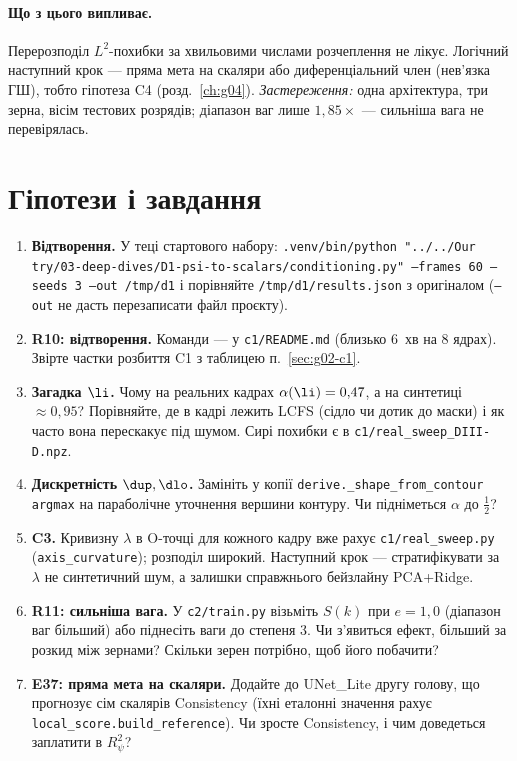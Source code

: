 \paragraph{Що з цього випливає.} Перерозподіл $L^2$-похибки за хвильовими числами розчеплення не
лікує. Логічний наступний крок --- пряма мета на скаляри або диференціальний член (нев'язка ГШ),
тобто гіпотеза C4 (розд.~\ref{ch:g04}). \emph{Застереження:} одна архітектура, три зерна, вісім
тестових розрядів; діапазон ваг лише $1{,}85\times$ --- сильніша вага не перевірялась.

\section{Гіпотези і завдання}\label{sec:g02-tasks}

\begin{practicum}
\begin{enumerate}
\item \textbf{Відтворення.} У теці стартового набору:
  \texttt{.venv/bin/python "../../Our try/03-deep-dives/D1-psi-to-scalars/conditioning.py"
  --frames 60 --seeds 3 --out /tmp/d1} і порівняйте \texttt{/tmp/d1/results.json} з
  оригіналом (\texttt{--out} не дасть перезаписати файл проєкту).
\item \textbf{R10: відтворення.} Команди --- у \texttt{c1/README.md} (близько 6~хв на
  8 ядрах). Звірте частки розбиття C1 з таблицею п.~\ref{sec:g02-c1}.
\item \textbf{Загадка $\li$.} Чому на реальних кадрах $\alpha(\li)=0{,}47$, а на синтетиці
  $\approx0{,}95$? Порівняйте, де в кадрі лежить LCFS (сідло чи дотик до маски) і як часто
  вона перескакує під шумом. Сирі похибки є в \texttt{c1/real\_sweep\_DIII-D.npz}.
\item \textbf{Дискретність $\dup,\dlo$.} Замініть у копії \texttt{derive.\_shape\_from\_contour}
  \texttt{argmax} на параболічне уточнення вершини контуру. Чи підніметься $\alpha$ до $\tfrac12$?
\item \textbf{C3.} Кривизну $\lambda$ в O-точці для кожного кадру вже рахує
  \texttt{c1/real\_sweep.py} (\texttt{axis\_curvature}); розподіл широкий. Наступний крок ---
  стратифікувати за $\lambda$ не синтетичний шум, а залишки справжнього бейзлайну PCA+Ridge.
\item \textbf{R11: сильніша вага.} У \texttt{c2/train.py} візьміть $S(k)$ при $e=1{,}0$
  (діапазон ваг більший) або піднесіть ваги до степеня 3. Чи з'явиться ефект, більший за розкид
  між зернами? Скільки зерен потрібно, щоб його побачити?
\item \textbf{E37: пряма мета на скаляри.} Додайте до UNet\_Lite другу голову, що прогнозує сім
  скалярів Consistency (їхні еталонні значення рахує \texttt{local\_score.build\_reference}).
  Чи зросте Consistency, і чим доведеться заплатити в $R^2_\psi$?
\end{enumerate}
\end{practicum}
